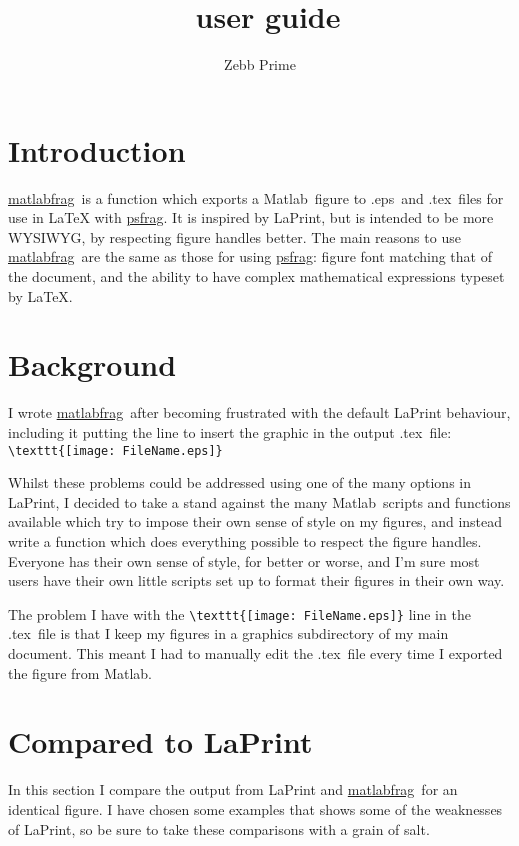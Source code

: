\documentclass[a4paper,11pt]{article}
\title{\matlabfrag\ user guide}
\author{Zebb Prime}
\newcommand\matlabfrag{\texorpdfstring{\href{http://www.mathworks.com/matlabcentral/fileexchange/21286}{{\ttfamily matlabfrag}}}{matlabfrag}}
\newcommand\psfragname{\texorpdfstring{\href{http://www.ctan.org/tex-archive/help/Catalogue/entries/psfrag.html}{{\ttfamily psfrag}}}{psfrag}}
\newcommand\matlab{\texorpdfstring{{\sc Matlab}}{Matlab}}
\newcommand\tex{\texorpdfstring{{\sc .tex}}{.tex}}
\newcommand\eps{\texorpdfstring{{\sc .eps}}{.eps}}
\begin{document}
	\maketitle
	\tableofcontents
	\section{Introduction}%
	\matlabfrag\ is a function which exports a \matlab\ figure to \eps\ and \tex\ files for use in LaTeX
	with \psfragname. It is inspired by LaPrint, but is intended to be more WYSIWYG, by respecting figure
	handles better. The main reasons to use \matlabfrag\ are the same as those for using \psfragname: figure
	font matching that of the document, and the ability to have complex mathematical expressions typeset
	by LaTeX.
	
	\section{Background}%
	I wrote \matlabfrag\ after becoming frustrated with the default LaPrint behaviour, including it
	putting the line to insert the graphic in the output \tex\ file: \verb|\texttt{[image: FileName.eps]}|
	
	Whilst these problems could be addressed using one of the many options in LaPrint, I decided to
	take a stand against the many \matlab{}ripts and functions available which try to impose their
	own sense of style on my figures, and instead write a function which does everything possible to
	respect the figure handles. Everyone has their own sense of style, for better or worse, and I'm sure
	most users have their own little scripts set up to format their figures in their own way.
	
	The problem I have with the \verb|\texttt{[image: FileName.eps]}| line in the \tex\
	file is that I keep my figures in a {\ttfamily graphics} subdirectory of my main document. This meant I had to
	manually edit the \tex\ file every time I exported the figure from \matlab.
	
	\section{Compared to LaPrint}%
	In this section I compare the output from {\ttfamily LaPrint} and \matlabfrag\ for an identical
	figure. I have chosen some examples that shows some of the weaknesses of {\ttfamily LaPrint}, so
	be sure to take these comparisons with a grain of salt.
	
\end{document}
